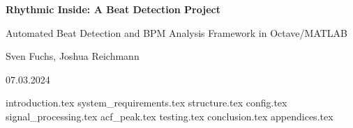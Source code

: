 \documentclass[a4paper,12pt,oneside]{article}
\begin{document}
\pagestyle{fancy}

\begin{titlepage}
    \centering
    \vspace*{1cm}
    
    {\Large\bfseries Rhythmic Inside: A Beat Detection Project\par}
    \vspace{0.5cm}
    {\large Automated Beat Detection and BPM Analysis Framework in Octave/MATLAB\par}
    
    \vspace{1.5cm}
    
    {\Large Sven Fuchs, Joshua Reichmann\par}
    \vspace{0.5cm}
    {\Large 07.03.2024\par}
    
    \vfill
\end{titlepage}

\tableofcontents
\newpage


{introduction.tex}
{system_requirements.tex}
{structure.tex}
{config.tex}
{signal_processing.tex}
{acf_peak.tex}
{testing.tex}
{conclusion.tex}
{appendices.tex}

\newpage
\printbibliography
\listoffigures
\listoftables
\end{document}
